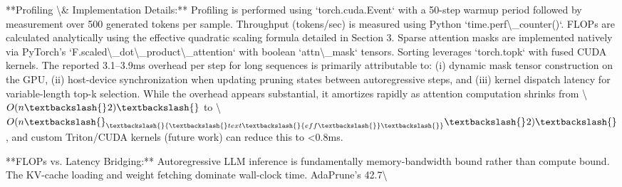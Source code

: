\documentclass[11pt,a4paper]{article}
\begin{document}
**Profiling \textbackslash{}& Implementation Details:** Profiling is performed using `torch.cuda.Event` with a 50-step warmup period followed by measurement over 500 generated tokens per sample. Throughput (tokens/sec) is measured using Python `time.perf\textbackslash{}_counter()`. FLOPs are calculated analytically using the effective quadratic scaling formula detailed in Section 3. Sparse attention masks are implemented natively via PyTorch's `F.scaled\textbackslash{}_dot\textbackslash{}_product\textbackslash{}_attention` with boolean `attn\textbackslash{}_mask` tensors. Sorting leverages `torch.topk` with fused CUDA kernels. The reported 3.1–3.9ms overhead per step for long sequences is primarily attributable to: (i) dynamic mask tensor construction on the GPU, (ii) host-device synchronization when updating pruning states between autoregressive steps, and (iii) kernel dispatch latency for variable-length top-k selection. While the overhead appears substantial, it amortizes rapidly as attention computation shrinks from \textbackslash{}$O(n\textbackslash{}^{}2)\textbackslash{}$ to \textbackslash{}$O(n\textbackslash{}_\textbackslash{}{\textbackslash{}text\textbackslash{}{eff\textbackslash{}}\textbackslash{}}\textbackslash{}^{}2)\textbackslash{}$, and custom Triton/CUDA kernels (future work) can reduce this to <0.8ms.

**FLOPs vs. Latency Bridging:** Autoregressive LLM inference is fundamentally memory-bandwidth bound rather than compute bound. The KV-cache loading and weight fetching dominate wall-clock time. AdaPrune's 42.7\textbackslash{}%
\end{document}
